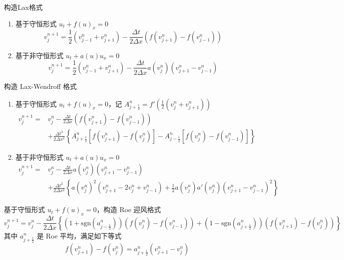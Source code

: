 \begin{example}
    构造Lax格式
    \begin{enumerate}
        \item 基于守恒形式 $u_t + f(u)_x = 0$
              \[
                  v_j^{n+1} = \frac12 (v_{j-1}^n + v_{j+1}^n)
                  - \frac{\Delta t}{2\Delta x} \left(f(v_{j+1}^n)-f(v_{j-1}^n)\right)
              \]
        \item 基于非守恒形式 $u_t + a(u) u_x = 0$
              \[
                  v_j^{n+1} = \frac12 (v_{j-1}^n + v_{j+1}^n)
                  - \frac{\Delta t}{2\Delta x} a(v_j^n)\left(v_{j+1}^n-v_{j-1}^n\right)
              \]
    \end{enumerate}
\end{example}

\begin{example}
    构造 Lax-Wendroff 格式
    \begin{enumerate}
        \item 基于守恒形式 $u_t + f(u)_x = 0$，记 $A_{j+\frac12}^n = f'(\frac12(v_j^n+v_{j+1}^n))$
              \begin{align*}
                  v_j^{n+1} ={} & v_j^n
                  - \frac{\Delta t}{2\Delta x} \left(f(v_{j+1}^n)-f(v_{j-1}^n)\right)
                  \\ & + \frac{\Delta t^2}{2\Delta x^2}\left\{
                  A_{j+\frac12}^n [f(v_{j+1}^n) - f(v_{j}^n)]
                  - A_{j-\frac12}^n [f(v_{j}^n) - f(v_{j-1}^n)]
                  \right\}
              \end{align*}
        \item 基于非守恒形式 $u_t + a(u) u_x = 0$
              \begin{align*}
                  v_j^{n+1} ={} & v_j^n
                  - \frac{\Delta t}{2\Delta x} a(v_j^n)\left(v_{j+1}^n-v_{j-1}^n\right)
                  \\ & + \frac{\Delta t^2}{2\Delta x^2}\left\{
                  a(v_j^n)^2(v_{j+1}^n - 2 v_j^n + v_{j-1}^n)
                  + \frac12 a(v_j^n)a'(v_j^n)(v_{j+1}^n-v_{j-1}^n)^2
                  \right\}
              \end{align*}
    \end{enumerate}
\end{example}


\begin{example}
    基于守恒形式 $u_t + f(u)_x = 0$，构造 Roe 迎风格式
    \[
        v_j^{n+1} = v_j^n - \frac{\Delta t}{2\Delta x}
        \left\{
        (1+\text{sgn}(a_{j-\frac12}^n))(f(v_{j}^n)-f(v_{j-1}^n))
        + (1-\text{sgn}(a_{j+\frac12}^n))(f(v_{j+1}^n)-f(v_{j}^n))
        \right\}
    \]
    其中 $a_{j+\frac12}^n$ 是 Roe 平均，满足如下等式
    \[
        f(v_{j+1}^n)-f(v_{j}^n) = a_{j+\frac12}^n(v_{j+1}^n-v_j^n)
    \]
\end{example}


